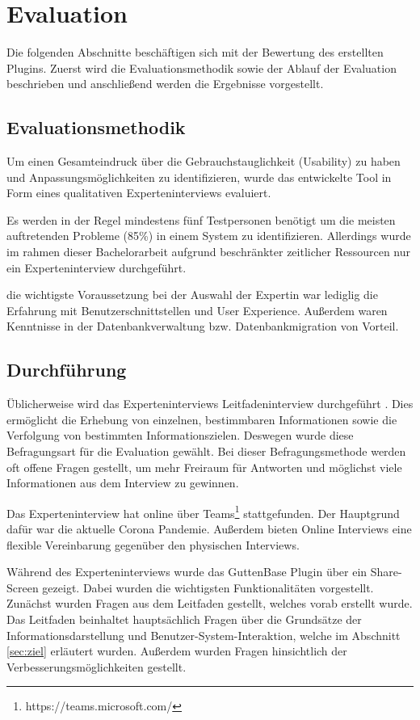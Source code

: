 \chapter{Evaluation}
\label{sec:evaluation}



Die folgenden Abschnitte beschäftigen sich mit der Bewertung des erstellten Plugins. Zuerst wird die Evaluationsmethodik sowie der Ablauf der Evaluation beschrieben und anschließend werden die Ergebnisse vorgestellt.
\section{Evaluationsmethodik}
Um einen Gesamteindruck über die Gebrauchstauglichkeit (Usability) zu haben und Anpassungsmöglichkeiten zu identifizieren, wurde das entwickelte Tool in Form eines qualitativen Experteninterviews evaluiert. 

Es werden in der Regel mindestens fünf Testpersonen benötigt um die meisten auftretenden Probleme (85\%) in einem System zu identifizieren\cite{nielsen1993mathematical}. Allerdings wurde im rahmen dieser Bachelorarbeit  aufgrund beschränkter zeitlicher Ressourcen nur ein Experteninterview durchgeführt. 

die wichtigste Voraussetzung bei der Auswahl der Expertin war lediglig die Erfahrung mit Benutzerschnittstellen und User Experience. Außerdem waren Kenntnisse in der Datenbankverwaltung bzw. Datenbankmigration von Vorteil. 

\section{Durchführung}
Üblicherweise wird das Experteninterviews Leitfadeninterview durchgeführt \cite{mayring1994qualitative}. Dies ermöglicht die Erhebung von einzelnen, bestimmbaren Informationen sowie die Verfolgung von bestimmten Informationszielen. Deswegen wurde diese Befragungsart für die Evaluation gewählt. Bei dieser Befragungsmethode werden oft offene Fragen gestellt, um mehr Freiraum für Antworten und möglichst viele Informationen aus dem Interview zu gewinnen.

Das Experteninterview hat online über Teams\footnote{https://teams.microsoft.com/} stattgefunden. Der Hauptgrund dafür war die aktuelle Corona Pandemie. Außerdem bieten Online Interviews eine flexible Vereinbarung gegenüber den physischen Interviews.

Während des Experteninterviews wurde das GuttenBase Plugin über ein Share-Screen gezeigt. Dabei wurden die wichtigsten Funktionalitäten vorgestellt. 
Zunächst wurden Fragen aus dem Leitfaden gestellt, welches vorab erstellt wurde. Das Leitfaden beinhaltet hauptsächlich Fragen über die Grundsätze der Informationsdarstellung und Benutzer-System-Interaktion, welche im Abschnitt \ref{sec:ziel} erläutert wurden. Außerdem wurden Fragen hinsichtlich der Verbesserungsmöglichkeiten gestellt.




